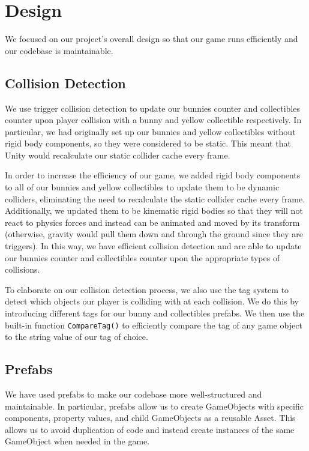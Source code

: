 \documentclass[12pt]{article}
\begin{document}
\section{Design}
  We focused on our project's overall design so that our game runs efficiently and our codebase is maintainable.

\subsection{Collision Detection}
  We use trigger collision detection to update our bunnies counter and collectibles counter upon player collision with a bunny and yellow collectible respectively.
  In particular, we had originally set up our bunnies and yellow collectibles without rigid body components, so they were considered to be static. This meant that Unity would recalculate our static collider cache every frame. 

  In order to increase the efficiency of our game, we added rigid body components to all of our bunnies and yellow collectibles to update them to be dynamic colliders, eliminating the need to recalculate the static collider cache every frame. Additionally, we updated them to be kinematic rigid bodies so that they will not react to physics forces and instead can be animated and moved by its transform (otherwise, gravity would pull them down and through the ground since they are triggers). 
  In this way, we have efficient collision detection and are able to update our bunnies counter and collectibles counter upon the appropriate types of collisions. 

  To elaborate on our collision detection process, we also use the tag system to detect which objects our player is colliding with at each collision. We do this by introducing different tags for our bunny and collectibles prefabs. We then use the built-in function \verb+CompareTag()+ to efficiently compare the tag of any game object to the string value of our tag of choice. 

\subsection{Prefabs}
  We have used prefabs to make our codebase more well-structured and maintainable.
  In particular, prefabs allow us to create GameObjects with specific components, property values, and child GameObjects as a reusable Asset. This allows us to avoid duplication of code and instead create instances of the same GameObject when needed in the game. 
\end{document}
